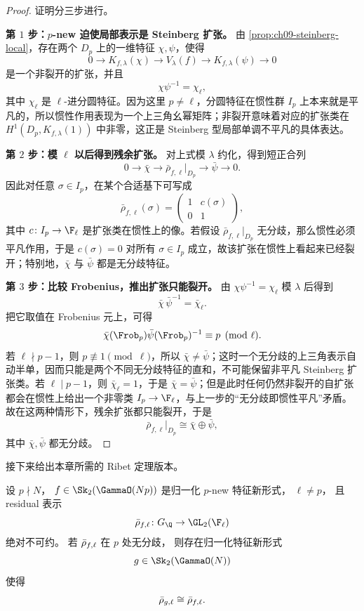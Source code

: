 \begin{proof}
证明分三步进行。

\textbf{第 $1$ 步：$p$-new 迫使局部表示是 Steinberg 扩张。}
由 \cref{prop:ch09-steinberg-local}，存在两个 $D_p$ 上的一维特征 $\chi,\psi$，使得
\[
0\to K_{f,\lambda}(\chi)\to V_\lambda(f)\to K_{f,\lambda}(\psi)\to 0
\]
是一个非裂开的扩张，并且
\[
\chi\psi^{-1}=\chi_\ell,
\]
其中 $\chi_\ell$ 是 $\ell$-进分圆特征。因为这里 $p\neq \ell$，分圆特征在惯性群 $I_p$ 上本来就是平凡的，所以惯性作用表现为一个上三角幺幂矩阵；非裂开意味着对应的扩张类在 $H^1(D_p,K_{f,\lambda}(1))$ 中非零，这正是 Steinberg 型局部单调不平凡的具体表达。

\textbf{第 $2$ 步：模 $\ell$ 以后得到残余扩张。}
对上式模 $\lambda$ 约化，得到短正合列
\[
0\to \bar\chi\to \bar\rho_{f,\ell}|_{D_p}\to \bar\psi\to 0.
\]
因此对任意 $\sigma\in I_p$，在某个合适基下可写成
\[
\bar\rho_{f,\ell}(\sigma)=
\begin{pmatrix}
1 & c(\sigma)\\
0 & 1
\end{pmatrix},
\]
其中 $c\colon I_p\to \F_\ell$ 是扩张类在惯性上的像。若假设 $\bar\rho_{f,\ell}|_{D_p}$ 无分歧，那么惯性必须平凡作用，于是 $c(\sigma)=0$ 对所有 $\sigma\in I_p$ 成立，故该扩张在惯性上看起来已经裂开；特别地，$\bar\chi$ 与 $\bar\psi$ 都是无分歧特征。

\textbf{第 $3$ 步：比较 Frobenius，推出扩张只能裂开。}
由 $\chi\psi^{-1}=\chi_\ell$ 模 $\lambda$ 后得到
\[
\bar\chi\,\bar\psi^{-1}=\bar\chi_\ell.
\]
把它取值在 Frobenius 元上，可得
\[
\bar\chi(\Frob_p)\bar\psi(\Frob_p)^{-1}\equiv p \pmod{\ell}.
\]
若 $\ell\nmid p-1$，则 $p\not\equiv 1\pmod{\ell}$，所以 $\bar\chi\neq \bar\psi$；这时一个无分歧的上三角表示自动半单，因而只能是两个不同无分歧特征的直和，不可能保留非平凡 Steinberg 扩张类。若 $\ell\mid p-1$，则 $\bar\chi_\ell=1$，于是 $\bar\chi=\bar\psi$；但是此时任何仍然非裂开的自扩张都会在惯性上给出一个非零类 $I_p\to \F_\ell$，与上一步的“无分歧即惯性平凡”矛盾。故在这两种情形下，残余扩张都只能裂开，于是
\[
\bar\rho_{f,\ell}|_{D_p}\cong \bar\chi\oplus \bar\psi,
\]
其中 $\bar\chi,\bar\psi$ 都无分歧。
\end{proof}

接下来给出本章所需的 Ribet 定理版本。

\begin{theorem}
\label{thm:ch09-ribet-level-lowering}
设 $p\nmid N$，
$f\in \Sk_2(\GammaO(Np))$ 是归一化 $p$-new 特征新形式，
$\ell\neq p$，
且 residual 表示
\[
  \rhobar_{f,\ell}\colon G_\Q\to \GL_2(\F_\ell)
\]
绝对不可约。
若 $\bar{\rho}_{f,\ell}$ 在 $p$ 处无分歧，
则存在归一化特征新形式
\[
  g\in \Sk_2(\GammaO(N))
\]
使得
\[
  \bar{\rho}_{g,\ell}\cong \bar{\rho}_{f,\ell}.
\]
\end{theorem}

